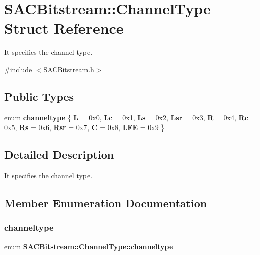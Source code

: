 \section{S\+A\+C\+Bitstream\+:\+:Channel\+Type Struct Reference}
\label{struct_s_a_c_bitstream_1_1_channel_type}


It specifies the channel type.  




{\ttfamily \#include $<$S\+A\+C\+Bitstream.\+h$>$}

\subsection*{Public Types}
\begin{DoxyCompactItemize}
\item 
enum \textbf{ channeltype} \{ \newline
\textbf{ L} = 0x0, 
\textbf{ Lc} = 0x1, 
\textbf{ Ls} = 0x2, 
\textbf{ Lsr} = 0x3, 
\newline
\textbf{ R} = 0x4, 
\textbf{ Rc} = 0x5, 
\textbf{ Rs} = 0x6, 
\textbf{ Rsr} = 0x7, 
\newline
\textbf{ C} = 0x8, 
\textbf{ L\+FE} = 0x9
 \}
\end{DoxyCompactItemize}


\subsection{Detailed Description}
It specifies the channel type. 

\subsection{Member Enumeration Documentation}
\mbox{\label{struct_s_a_c_bitstream_1_1_channel_type_a31c32b34085c06a1c58d920ca28c17c9}} 
\subsubsection{channeltype}
{\footnotesize\ttfamily enum \textbf{ S\+A\+C\+Bitstream\+::\+Channel\+Type\+::channeltype}}

